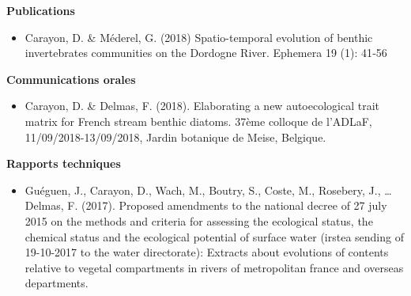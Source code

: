 %
%
%


\textbf{Publications}
\begin{itemize}
\item Carayon, D. \& Méderel, G. (2018) Spatio-temporal evolution of benthic invertebrates communities on the Dordogne River. Ephemera 19 (1): 41‑56
\end{itemize}

\textbf{Communications orales}
\begin{itemize}
\item Carayon, D. \& Delmas, F. (2018). Elaborating a new autoecological trait matrix for French stream benthic diatoms. 37ème colloque de l’ADLaF, 11/09/2018-13/09/2018, Jardin botanique de Meise, Belgique.
\end{itemize}

\textbf{Rapports techniques}
\begin{itemize}
\item Guéguen, J., Carayon, D., Wach, M., Boutry, S., Coste, M., Rosebery, J., … Delmas, F. (2017). Proposed amendments to the national decree of 27 july 2015 on the methods and criteria for assessing the ecological status, the chemical status and the ecological potential of surface water (irstea sending of 19-10-2017 to the water directorate): Extracts about evolutions of contents relative to vegetal compartments in rivers of metropolitan france and overseas departments.
\end{itemize}